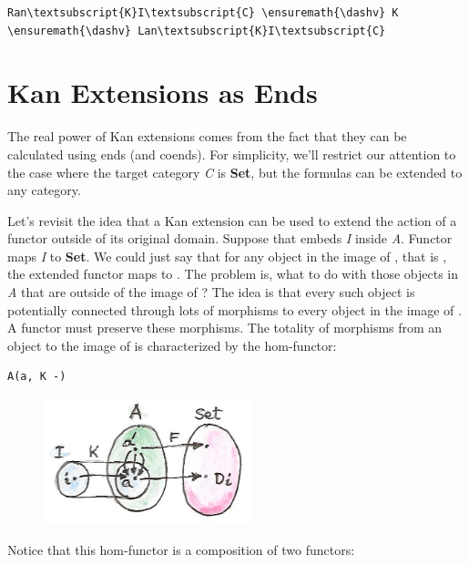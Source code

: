 \begin{Verbatim}[commandchars=\\\{\}]
Ran\textsubscript{K}I\textsubscript{C} \ensuremath{\dashv} K \ensuremath{\dashv} Lan\textsubscript{K}I\textsubscript{C}
\end{Verbatim}

\section{Kan Extensions as Ends}\label{kan-extensions-as-ends}

The real power of Kan extensions comes from the fact that they can be
calculated using ends (and coends). For simplicity, we'll restrict our
attention to the case where the target category \emph{C} is
\textbf{Set}, but the formulas can be extended to any category.

Let's revisit the idea that a Kan extension can be used to extend the
action of a functor outside of its original domain. Suppose that
 embeds \emph{I} inside \emph{A}. Functor  maps
\emph{I} to \textbf{Set}. We could just say that for any object
 in the image of , that is , the
extended functor maps  to . The problem is, what
to do with those objects in \emph{A} that are outside of the image of
? The idea is that every such object is potentially connected
through lots of morphisms to every object in the image of . A
functor must preserve these morphisms. The totality of morphisms from an
object  to the image of  is characterized by the
hom-functor:

\begin{Verbatim}[commandchars=\\\{\}]
A(a, K -)
\end{Verbatim}

\begin{figure}[H]
\centering
\includegraphics[width=60mm]{images/kan13.jpg}
\end{figure}

\noindent
Notice that this hom-functor is a composition of two functors:

